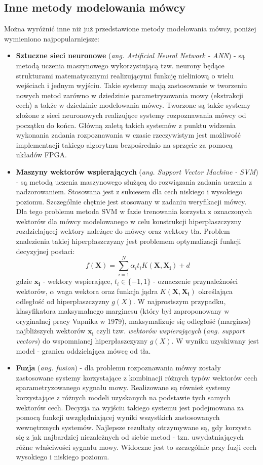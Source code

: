 \subsection{Inne metody modelowania mówcy}
Można wyróżnić inne niż już przedstawione metody modelowania mówcy, poniżej wymieniono najpopularniejsze:
\begin{itemize}
  \item{\textbf{Sztuczne sieci neuronowe} (\textit{ang. Artificial Neural Network - ANN})} - są metodą uczenia maszynowego wykorzystującą tzw. neurony będące strukturami matematycznymi realizującymi funkcję nieliniową o wielu wejściach i jednym wyjściu. Takie systemy mają zastosowanie w tworzeniu nowych metod zarówno w dziedzinie parametryzowania mowy (ekstrakcji cech) a także w dziedzinie modelowania mówcy. Tworzone są także systemy złożone z sieci neuronowych realizujące systemy rozpoznawania mówcy od początku do końca. Główną zaletą takich systemów z punktu widzenia wykonania zadania rozpoznawania w czasie rzeczywistym jest możliwość implementacji takiego algorytmu bezpośrednio na sprzęcie za pomocą układów FPGA.
  \item{\textbf{Maszyny wektorów wspierających} (\textit{ang. Support Vector Machine - SVM}) \label{svm}} - są metodą uczenia maszynowego służącą do rozwiązania zadania uczenia z nadzorowaniem. Stosowana jest z sukcesem dla cech niskiego i wysokiego poziomu. Szczególnie chętnie jest stosowany w zadaniu weryfikacji mówcy. Dla tego problemu metoda SVM w fazie trenowania korzysta z oznaczonych wektorów dla mówcy modelowanego w celu konstrukcji hiperpłaszczyzny rozdzielającej wektory należące do mówcy oraz wektory tła. Problem znalezienia takiej hiperpłaszczyzny jest problemem optymalizacji funkcji decyzyjnej postaci:
\begin{equation}
  f(\bm{X}) =\sum^N_{i=1}\alpha_it_iK(\bm{X},\bm{X_i}) + d
\end{equation}
    gdzie $\bm{x_i}$ - wektory wspierające, $t_i \in \{-1,1\}$ - oznaczenie przynależności wektorów, $\alpha$ waga wektora oraz funkcja jądra $K(\bm{X},\bm{X_i})$ określająca odległość od hiperpłaszczyzny $g(X)$.
    W najprostszym przypadku, klasyfikatora maksymalnego marginesu (który był zaproponowany w oryginalnej pracy Vapnika w 1979),  maksymalizuje się odległość (margines) najbliższych wektorów $\bm{x_i}$ czyli tzw. \textit{wektorów wspierających}  (\textit{ang. support vectors}) do wspomnianej hiperpłaszczyzny  $g(X)$. W wyniku uzyskiwany jest model - granica oddzielająca mówcę od tła.
  \item{\textbf{Fuzja} (\textit{ang. fusion})} - dla problemu rozpoznawania mówcy zostały zastosowane systemy korzystające z kombinacji różnych typów wektorów cech sparametryzowanego sygnału mowy. Realizowane są również systemy korzystające z różnych modeli uzyskanych na podstawie tych samych wektorów cech. Decyzja na wyjściu takiego systemu jest podejmowana za pomocą funkcji uwzględniającej wyniki wszystkich zastosowanych wewnętrznych systemów. Najlepsze rezultaty otrzymywane
      są, gdy korzysta się
      z jak najbardziej niezależnych od siebie metod - tzn. uwydatniających różne właściwości sygnału mowy. Widoczne jest to szczególnie przy fuzji cech wysokiego i niskiego poziomu.
\end{itemize}

